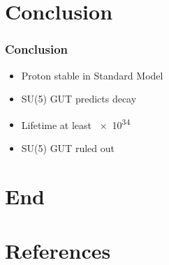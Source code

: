 \documentclass[english, fleqn]{beamer}
\begin{document}
\section{Conclusion}

\begin{frame}
    \frametitle{Conclusion}

    \begin{itemize}
        \item Proton stable in Standard Model
        \item SU(5) GUT predicts decay
        \item Lifetime at least \SI{e34}{\year} \parencite{super-k/proton_decay}
        \item SU(5) GUT ruled out
    \end{itemize}
\end{frame}


\section*{End}

\begin{frame}
    \titlepage
\end{frame}

\nocite{tikz-feynman}

\section*{References}

\begin{frame}[allowframebreaks]

    \printbibliography
\end{frame}
\end{document}

